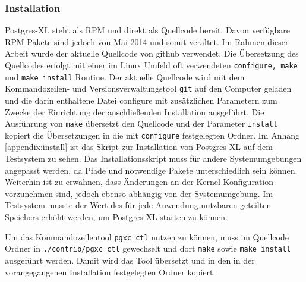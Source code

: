 \subsubsection{Installation}
Postgres-XL steht als RPM und direkt als Quellcode bereit.
Davon verfügbare RPM Pakete sind jedoch von Mai 2014 und somit veraltet.
Im Rahmen dieser Arbeit wurde der aktuelle Quellcode von github verwendet.
Die Übersetzung des Quellcodes erfolgt mit einer im Linux Umfeld oft verwendeten \verb+configure, make+ und \verb+make install+ Routine.
Der aktuelle Quellcode wird mit dem Kommandozeilen- und Versionsverwaltungstool \verb+git+ auf den Computer geladen und die darin enthaltene Datei configure mit zusätzlichen Parametern zum Zwecke der Einrichtung der anschließenden Installation ausgeführt.
Die Ausführung von \verb+make+ übersetzt den Quellcode und der Parameter \verb+install+ kopiert die Übersetzungen in die mit \verb+configure+ festgelegten Ordner.
Im Anhang \ref{appendix:install} ist das Skript zur Installation von Postgres-XL auf dem Testsystem zu sehen.
Das Installationsskript muss für andere Systemumgebungen angepasst werden, da Pfade und notwendige Pakete unterschiedlich sein können.
Weiterhin ist zu erwähnen, dass Änderungen an der Kernel-Konfiguration vorzunehmen  sind, jedoch ebenso abhängig von der Systemumgebung.
Im Testsystem musste der Wert des für jede Anwendung nutzbaren geteilten Speichers erhöht werden, um Postgres-XL starten zu können.

Um das Kommandozeilentool \verb+pgxc_ctl+ nutzen zu können, muss im Quellcode Ordner in \verb+./contrib/pgxc_ctl+ gewechselt und dort \verb+make+ sowie \verb+make install+ ausgeführt werden. Damit wird das Tool übersetzt und in den in der vorangegangenen Installation festgelegten Ordner kopiert.

